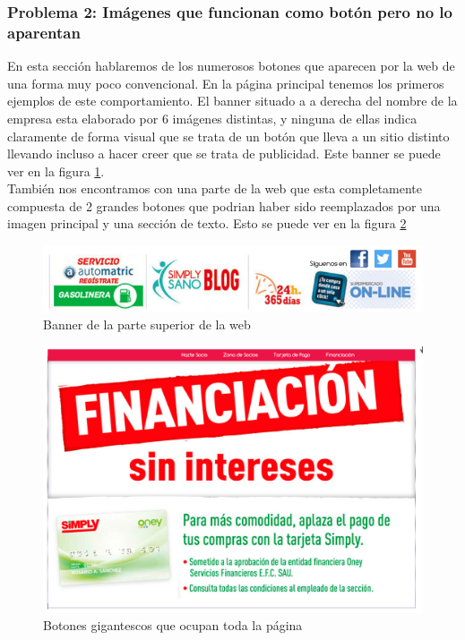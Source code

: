 \documentclass[a4paper,11pt]{article}
\begin{document}
\subsubsection{Problema 2: Imágenes que funcionan como botón pero no lo aparentan}
En esta sección hablaremos de los numerosos botones que aparecen por la web de una forma muy poco convencional.
En la página principal tenemos los primeros ejemplos de este comportamiento. El banner situado a a derecha del nombre de la empresa esta elaborado por 6 imágenes distintas, y ninguna de ellas indica claramente de forma visual que se trata de un botón que lleva a un sitio distinto llevando incluso a hacer creer que se trata de publicidad. Este banner se puede ver en la figura \ref{fig:bannerarriba}.\\
También nos encontramos con una parte de la web que esta completamente compuesta de 2 grandes botones que podrian haber sido reemplazados por una imagen principal y una sección de texto.
Esto se puede ver en la figura \ref{fig:pagcomplbot}



\begin{figure}[h!]
 \centering
 \includegraphics[scale=0.5]{bannerarriba.png}
 \caption{Banner de la parte superior de la web}
 \label{fig:bannerarriba}
\end{figure}

\begin{figure}[h!]
 \centering
 \includegraphics[scale=0.5]{botoncamuflado.png}
 \caption{Botones gigantescos que ocupan toda la página}
 \label{fig:pagcomplbot}
\end{figure}
\end{document}
